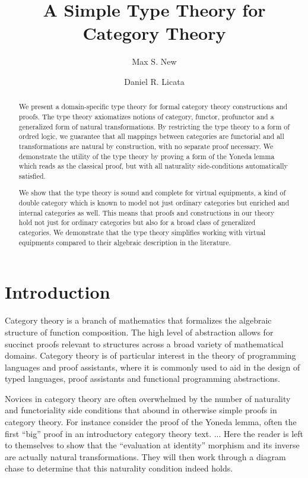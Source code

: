 \documentclass[a4paper,UKenglish,cleveref, autoref, thm-restate]{lipics-v2021}
\title{A Simple Type Theory for Category Theory} %
\author{Max S. New}
       {University of Michigan Computer Science \& Engineering, Ann Arbor, Michigan, USA \and \url{http://www.maxsnew.com} }
       {maxsnew@umich.edu}
       {}
       {}
\author{Daniel R. Licata}{Wesleyan University, Middletown, Connecticut, USA}
       {dlicata@wesleyan.edu}{}{}
\begin{document}
\maketitle

\begin{abstract}
  We present a domain-specific type theory for formal category theory
  constructions and proofs. The type theory axiomatizes notions of
  category, functor, profunctor and a generalized form of natural
  transformations. By restricting the type theory to a form of ordred
  logic, we guarantee that all mappings between categories are
  functorial and all transformations are natural by construction, with
  no separate proof necessary. We demonstrate the utility of the type
  theory by proving a form of the Yoneda lemma which reads as the
  classical proof, but with all naturality side-conditions
  automatically satisfied.

  We show that the type theory is sound and complete for virtual
  equipments, a kind of double category which is known to model not
  just ordinary categories but enriched and internal categories as
  well. This means that proofs and constructions in our theory hold
  not just for ordinary categories but also for a broad class of
  generalized categories. We demonstrate that the type theory
  simplifies working with virtual equipments compared to their
  algebraic description in the literature.
\end{abstract}

\section{Introduction}

Category theory is a branch of mathematics that formalizes the
algebraic structure of function composition. The high level of
abstraction allows for succinct proofs relevant to structures across a
broad variety of mathematical domains. Category theory is of
particular interest in the theory of programming languages and proof
assistants, where it is commonly used to aid in the design of typed
languages, proof assistants and functional programming abstractions.

Novices in category theory are often overwhelmed by the number of
naturality and functoriality side conditions that abound in otherwise
simple proofs in category theory. For instance consider the proof of
the Yoneda lemma, often the first ``big'' proof in an introductory
category theory text. ... Here the reader is left to themselves to
show that the ``evaluation at identity'' morphism and its inverse are
actually natural transformations. They will then work through a
diagram chase to determine that this naturality condition indeed
holds.
\end{document}
